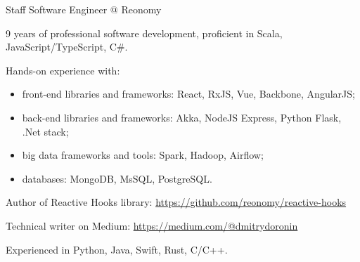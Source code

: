 \documentclass{resume}
\begin{document}

\begin{rSection}{ Staff Software Engineer @ Reonomy }

9 years of professional software development, proficient in Scala, JavaScript/TypeScript, C\#.

\item Hands-on experience with:
\begin{itemize}
    \item front-end libraries and frameworks: 
          React, RxJS, Vue, Backbone, AngularJS;
    \item back-end libraries and frameworks: 
          Akka, NodeJS Express, Python Flask, .Net stack;
    \item big data frameworks and tools:
          Spark, Hadoop, Airflow;
    \item databases:
          MongoDB, MsSQL, PostgreSQL.
\end{itemize}

\item Author of Reactive Hooks library: \url{https://github.com/reonomy/reactive-hooks}
\item Technical writer on Medium: \url{https://medium.com/@dmitrydoronin}
\item Experienced in Python, Java, Swift, Rust, C/C++.

\end{rSection}

\end{document}
